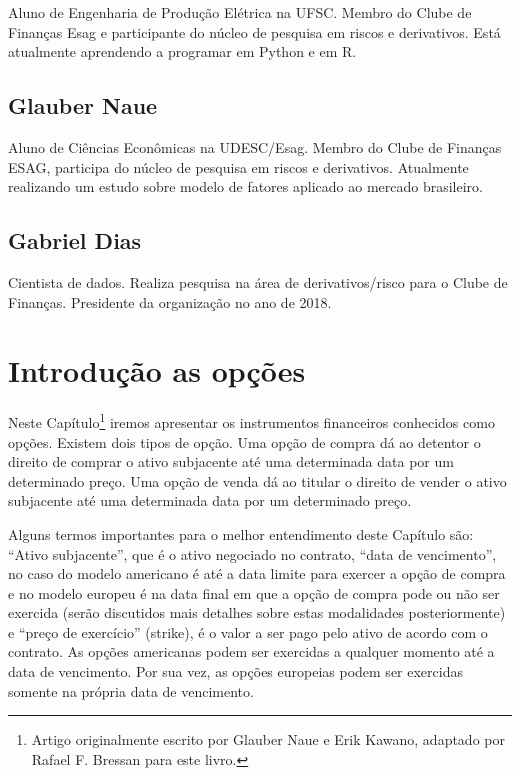 \documentclass[]{book}
\let\rmarkdownfootnote\footnote%
\def\footnote{\protect\rmarkdownfootnote}
\theoremstyle{definition}
\theoremstyle{definition}
\theoremstyle{definition}
\theoremstyle{remark}
\begin{document}
Aluno de Engenharia de Produção Elétrica na UFSC. Membro do Clube de Finanças Esag e participante do núcleo de pesquisa em riscos e derivativos. Está atualmente aprendendo a programar em Python e em R.

\hypertarget{glauber-naue}{%
\section*{Glauber Naue}\label{glauber-naue}}

Aluno de Ciências Econômicas na UDESC/Esag. Membro do Clube de Finanças ESAG, participa do núcleo de pesquisa em riscos e derivativos. Atualmente realizando um estudo sobre modelo de fatores aplicado ao mercado brasileiro.

\hypertarget{gabriel-dias}{%
\section*{Gabriel Dias}\label{gabriel-dias}}

Cientista de dados. Realiza pesquisa na área de derivativos/risco para o Clube de Finanças. Presidente da organização no ano de 2018.

\hypertarget{opcoes}{%
\chapter{Introdução as opções}\label{opcoes}}

Neste Capítulo\footnote{Artigo originalmente escrito por Glauber Naue e Erik Kawano, adaptado por Rafael F. Bressan para este livro.} iremos apresentar os instrumentos financeiros conhecidos como opções. Existem dois tipos de opção. Uma opção de compra dá ao detentor o direito de comprar o ativo subjacente até uma determinada data por um determinado preço. Uma opção de venda dá ao titular o direito de vender o ativo subjacente até uma determinada data por um determinado preço.

Alguns termos importantes para o melhor entendimento deste Capítulo são: ``Ativo subjacente'', que é o ativo negociado no contrato, ``data de vencimento'', no caso do modelo americano é até a data limite para exercer a opção de compra e no modelo europeu é na data final em que a opção de compra pode ou não ser exercida (serão discutidos mais detalhes sobre estas modalidades posteriormente) e ``preço de exercício'' (strike), é o valor a ser pago pelo ativo de acordo com o contrato. As opções americanas podem ser exercidas a qualquer momento até a data de vencimento. Por sua vez, as opções europeias podem ser exercidas somente na própria data de vencimento.
\end{document}

